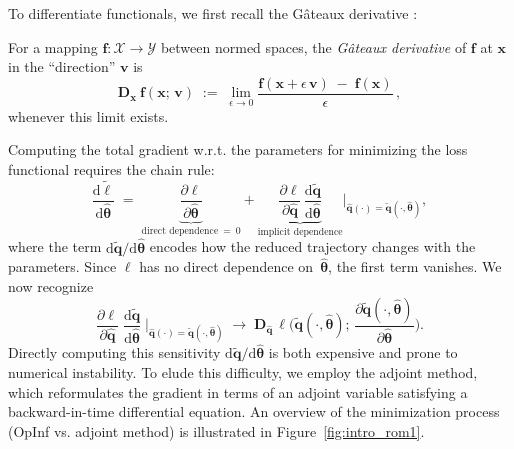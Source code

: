 To differentiate functionals, we first recall the Gâteaux derivative \cite{bonnans2013perturbation}:\\
\begin{definition}
    For a mapping $\mathbf{f}: \mathcal{X}\to\mathcal{Y}$ between normed spaces, the \emph{Gâteaux derivative} of $\mathbf{f}$ at $\mathbf{x}$ in the “direction” $\mathbf{v}$ is\\
    $$\bm{D}_{\mathbf{x}}~\mathbf{f}(\mathbf{x};\,\mathbf{v})
  \;:=\;
  \lim_{\epsilon\to0}
    \frac{\mathbf{f}(\mathbf{x} + \epsilon\,\mathbf{v})
           \;-\;\mathbf{f}(\mathbf{x})}
         {\epsilon}\,,$$
    whenever this limit exists.
\end{definition}
Computing the total gradient w.r.t. the parameters for minimizing the loss functional requires the chain rule:\\
\begin{equation}
  \frac{\mathrm{d}\tilde{\ell}}{\mathrm{d}\hat{\bm{\theta}}}
  \;=\;
  \underbrace{\frac{\partial \ell}{\partial \hat{\bm{\theta}}}}_{\text{direct dependence} ~=~0}
  + 
  \underbrace{\frac{\partial \ell}{\partial \hat{\mathbf{q}}}\,
                \frac{\mathrm{d} \tilde{\mathbf{q}}}{\mathrm{d} \hat{\bm{\theta}}}
               }_{\text{implicit dependence}} \Bigg\vert_{\hat{\mathbf{q}}(\cdot) = \tilde{\mathbf{q}}(\cdot, \hat{\bm{\theta}} ) },
    \label{eq:l_gradient}
\end{equation}
where the term $\mathrm{d} \tilde{\mathbf{q}}/\mathrm{d} \hat{\bm{\theta}}$ encodes how the reduced trajectory changes with the parameters. Since $\ell$ has no direct dependence on~$\hat{\bm{\theta}}$, the first term vanishes. We now recognize\\
$$\frac{\partial \ell}{\partial \hat{\mathbf{q}}}
    \;\frac{\mathrm{d}\tilde{\mathbf{q}}}{\mathrm{d}\hat{\bm{\theta}}}
  \;\Bigg\vert_{\hat{\mathbf{q}}(\cdot)=\tilde{\mathbf{q}}(\cdot, \hat{\bm{\theta}})}
  \;\longrightarrow\;
  \bm{D}_{\hat{\mathbf{q}}}\,\ell\biggl(\tilde{\mathbf{q}}(\cdot,\hat{\bm{\theta}});\,
    \dfrac{\partial\tilde{\mathbf{q}}(\cdot,\hat{\bm{\theta}})}{\partial\hat{\bm{\theta}}}
  \biggr).$$
Directly computing this sensitivity $\mathrm{d} \tilde{\mathbf{q}}/\mathrm{d} \hat{\bm{\theta}}$ is both expensive and prone to numerical instability.  To elude this difficulty, we employ the adjoint method, which reformulates the gradient in terms of an adjoint variable satisfying a backward-in-time differential equation. An overview of the minimization process (OpInf vs. adjoint method) is illustrated in Figure~\ref{fig:intro_rom1}.

